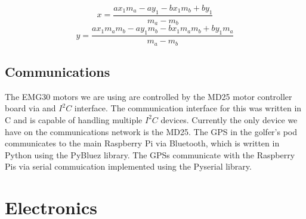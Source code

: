 \documentclass[11pt,landscape]{article}
\begin{document}
\begin{multicols}{3}
\begin{figure}[H]
\begin{mdframed}
    \begin{center}
        \begin{equation}
            x = \frac{ax_{1} m_{a} - ay_{1} - bx_{1} m_{b} + by_{1}}{m_{a} - m_{b}}
            \label{eq:x}
        \end{equation}
        \begin{equation}
            y = \frac{ax_{1} m_{a} m_{b} - ay_{1} m_{b} - bx_{1} m_{a} m_{b} + by_{1} m_{a}}{m_{a} - m_{b}}
            \label{eq:y}
        \end{equation}
    \end{center}
    \end{mdframed}
    \label{fig:segment_calculations}
\end{figure}



\subsection{Communications}
The EMG30 motors we are using are controlled by the MD25 motor controller board
via and $I^2C$ interface. The communication interface for this was written in C
and is capable of handling multiple $I^2C$ devices. Currently the only device we
have on the communications network is the MD25. The GPS in the golfer's pod communicates to the main Raspberry Pi via Bluetooth,
which is written in Python using the PyBluez library. The GPSs communicate with
the Raspberry Pis via serial commuication implemented using the Pyserial library.


\newpage
\section{Electronics}
\label{electronics}
\newpage
\nocite{*}


\end{multicols}
\end{document}
